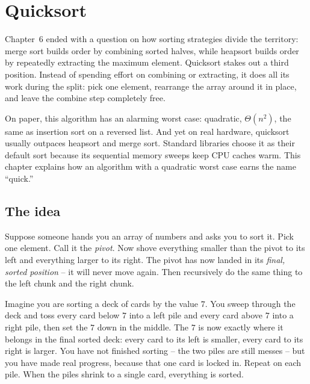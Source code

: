 \chapter{Quicksort}

\providecommand{\E}{\ensuremath{\mathbb{E}}}

Chapter~6 ended with a question on how sorting strategies divide the territory:
merge sort builds order by combining sorted halves, while heapsort builds order
by repeatedly extracting the maximum element. Quicksort stakes out a third
position. Instead of spending effort on combining or extracting, it does all its
work during the split: pick one element, rearrange the array around it in place,
and leave the combine step completely free.

On paper, this algorithm has an alarming worst case: quadratic, $\Theta(n^2)$, the
same as insertion sort on a reversed list. And yet on real hardware, quicksort
usually outpaces heapsort and merge sort. Standard libraries choose it as
their default sort because its sequential memory sweeps keep CPU caches warm.
This chapter explains how an algorithm with a quadratic worst case earns the
name ``quick.''

\chapterline

\section{The idea}

Suppose someone hands you an
array of numbers and asks you to sort it. Pick one element. Call it the \emph{pivot}. Now
shove everything smaller than the pivot to its left and everything larger to its
right. The pivot has now landed in its \emph{final, sorted position} -- it will
never move again. Then recursively do the same thing to the left chunk and the
right chunk.

\begin{intuitionbox}
Imagine you are sorting a deck of cards by the value $7$. You sweep through the
deck and toss every card below $7$ into a left pile and every card above $7$
into a right pile, then set the $7$ down in the middle. The $7$ is now exactly
where it belongs in the final sorted deck: every card to its left is smaller,
every card to its right is larger. You have not finished sorting -- the two
piles are still messes -- but you have made real progress, because that
one card is locked in. Repeat on each pile. When the piles shrink to a single
card, everything is sorted.
\end{intuitionbox}

